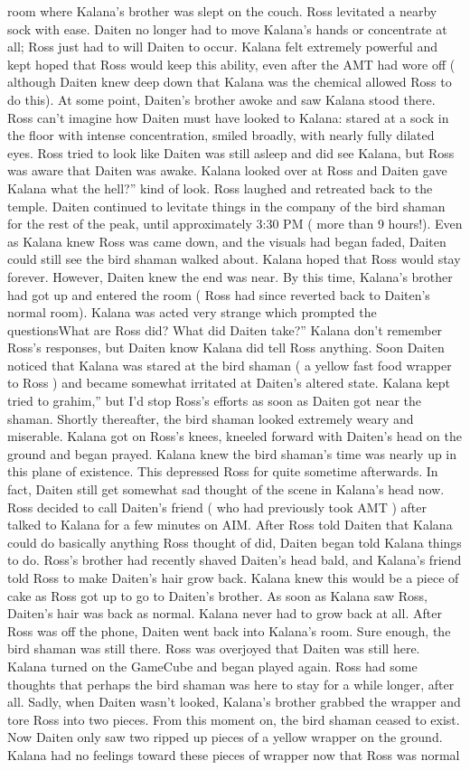 \documentclass[12pt]{book}
\begin{document}
room where Kalana's brother was slept on the couch. Ross levitated a nearby sock with ease. Daiten no longer had to move Kalana's hands or concentrate at all; Ross just had to will Daiten to occur. Kalana felt extremely powerful and kept hoped that Ross would keep this ability, even after the AMT had wore off ( although Daiten knew deep down that Kalana was the chemical allowed Ross to do this). At some point, Daiten's brother awoke and saw Kalana stood there. Ross can't imagine how Daiten must have looked to Kalana: stared at a sock in the floor with intense concentration, smiled broadly, with nearly fully dilated eyes. Ross tried to look like Daiten was still asleep and did see Kalana, but Ross was aware that Daiten was awake. Kalana looked over at Ross and Daiten gave Kalana what the hell?'' kind of look. Ross laughed and retreated back to the temple. Daiten continued to levitate things in the company of the bird shaman for the rest of the peak, until approximately 3:30 PM ( more than 9 hours!). Even as Kalana knew Ross was came down, and the visuals had began faded, Daiten could still see the bird shaman walked about. Kalana hoped that Ross would stay forever. However, Daiten knew the end was near. By this time, Kalana's brother had got up and entered the room ( Ross had since reverted back to Daiten's normal room). Kalana was acted very strange which prompted the questionsWhat are Ross did? What did Daiten take?'' Kalana don't remember Ross's responses, but Daiten know Kalana did tell Ross anything. Soon Daiten noticed that Kalana was stared at the bird shaman ( a yellow fast food wrapper to Ross ) and became somewhat irritated at Daiten's altered state. Kalana kept tried to grahim,'' but I'd stop Ross's efforts as soon as Daiten got near the shaman. Shortly thereafter, the bird shaman looked extremely weary and miserable. Kalana got on Ross's knees, kneeled forward with Daiten's head on the ground and began prayed. Kalana knew the bird shaman's time was nearly up in this plane of existence. This depressed Ross for quite sometime afterwards. In fact, Daiten still get somewhat sad thought of the scene in Kalana's head now. Ross decided to call Daiten's friend ( who had previously took AMT ) after talked to Kalana for a few minutes on AIM. After Ross told Daiten that Kalana could do basically anything Ross thought of did, Daiten began told Kalana things to do. Ross's brother had recently shaved Daiten's head bald, and Kalana's friend told Ross to make Daiten's hair grow back. Kalana knew this would be a piece of cake as Ross got up to go to Daiten's brother. As soon as Kalana saw Ross, Daiten's hair was back as normal. Kalana never had to grow back at all. After Ross was off the phone, Daiten went back into Kalana's room. Sure enough, the bird shaman was still there. Ross was overjoyed that Daiten was still here. Kalana turned on the GameCube and began played again. Ross had some thoughts that perhaps the bird shaman was here to stay for a while longer, after all. Sadly, when Daiten wasn't looked, Kalana's brother grabbed the wrapper and tore Ross into two pieces. From this moment on, the bird shaman ceased to exist. Now Daiten only saw two ripped up pieces of a yellow wrapper on the ground. Kalana had no feelings toward these pieces of wrapper now that Ross was normal 
\end{document}
